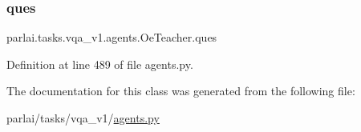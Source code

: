 \subsubsection{\texorpdfstring{ques}{ques}}
{\footnotesize\ttfamily parlai.\+tasks.\+vqa\+\_\+v1.\+agents.\+Oe\+Teacher.\+ques}



Definition at line 489 of file agents.\+py.



The documentation for this class was generated from the following file\+:\begin{DoxyCompactItemize}
\item 
parlai/tasks/vqa\+\_\+v1/\hyperlink{parlai_2tasks_2vqa__v1_2agents_8py}{agents.\+py}\end{DoxyCompactItemize}
